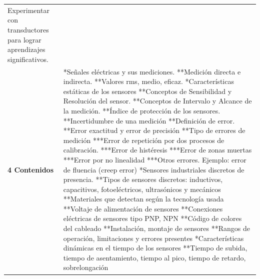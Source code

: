 \documentclass[letterpaper]{article}%
\begin{document}
\begin{longtable}{p{}p{}}
\newline%
Experimentar con transductores para lograr aprendizajes significativos.\\%
\par\fontsize{12}{0}\selectfont \textbf{\textcolor{parte}{4 Contenidos}}&*Señales eléctricas y sus mediciones.
\newline%
**Medición directa e indirecta.
\newline%
**Valores rms, medio, eficaz.
\newline%
*Características estáticas de los sensores
\newline%
**Conceptos de Sensibilidad y Resolución del sensor.
\newline%
**Conceptos de Intervalo y Alcance de la medición.
\newline%
**Índice de protección de los sensores.
\newline%
**Incertidumbre de una medición
\newline%
**Definición de error.
\newline%
**Error exactitud y error de precisión
\newline%
**Tipo de errores de medición
\newline%
***Error de repetición por dos procesos de calibración.
\newline%
***Error de histéresis
\newline%
***Error de zonas muertas
\newline%
***Error por no linealidad
\newline%
***Otros errores. Ejemplo: error de fluencia (creep error)
\newline%
*Sensores industriales discretos de presencia.
\newline%
**Tipos de sensores discretos: inductivos, capacitivos, fotoeléctricos, ultrasónicos  y mecánicos
\newline%
**Materiales que detectan según la tecnología usada
\newline%
**Voltaje de alimentación de sensores
\newline%
**Conexiones eléctricas de sensores tipo PNP, NPN
\newline%
**Código de colores del cableado
\newline%
**Instalación, montaje de sensores
\newline%
**Rangos de operación, limitaciones y errores presentes
\newline%
*Características dinámicas en el tiempo de los sensores 
\newline%
**Tiempo de subida, tiempo de asentamiento, tiempo al pico, tiempo de retardo, sobrelongación

\end{longtable}
\end{document}
